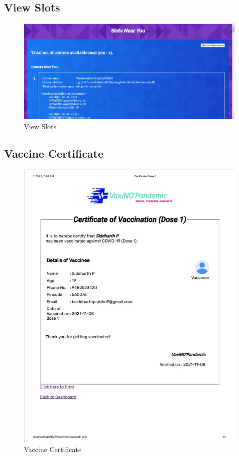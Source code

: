 \documentclass{article}
\begin{document}
    \subsection{View Slots}
        \begin{figure}[hbt]
            \centering
            \includegraphics[scale=0.406]{slots.jpg}
            \caption{View Slots}
            \label{fig:slots}
        \end{figure}
    \newpage
    \subsection{Vaccine Certificate}
        \begin{figure}[hbt]
            \centering
            \includegraphics[scale=0.9]{cert.jpg}
            \caption{Vaccine Certificate}
            \label{fig:certificate}
        \end{figure}
    \newpage
\end{document}
